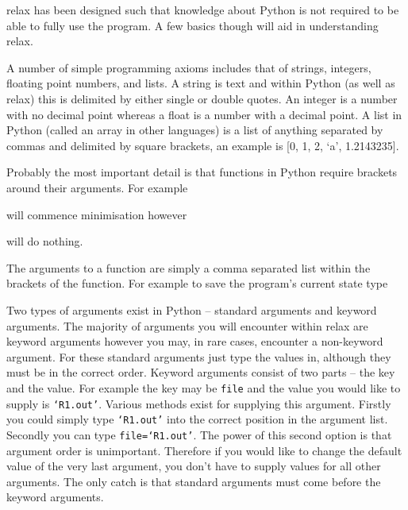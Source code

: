 relax has been designed such that knowledge about Python is not required to be able to fully use the program.  A few basics though will aid in understanding relax.

A number of simple programming axioms includes that of strings, integers, floating point numbers, and lists.  A string is text and within Python (as well as relax) this is delimited by either single or double quotes.  An integer is a number with no decimal point whereas a float is a number with a decimal point.  A list in Python (called an array in other languages) is a list of anything separated by commas and delimited by square brackets, an example is [0, 1, 2, `a', 1.2143235].

Probably the most important detail is that functions in Python require brackets around their arguments.  For example


will commence minimisation however


will do nothing.

The arguments to a function are simply a comma separated list within the brackets of the function.  For example to save the program's current state type


Two types of arguments exist in Python -- standard arguments and keyword arguments.  The majority of arguments you will encounter within relax are keyword arguments however you may, in rare cases, encounter a non-keyword argument.  For these standard arguments just type the values in, although they must be in the correct order.  Keyword arguments consist of two parts -- the key and the value.  For example the key may be \texttt{file} and the value you would like to supply is \texttt{`R1.out'}.  Various methods exist for supplying this argument.  Firstly you could simply type \texttt{`R1.out'} into the correct position in the argument list.  Secondly you can type \texttt{file=`R1.out'}.  The power of this second option is that argument order is unimportant.  Therefore if you would like to change the default value of the very last argument, you don't have to supply values for all other arguments.  The only catch is that standard arguments must come before the keyword arguments.


